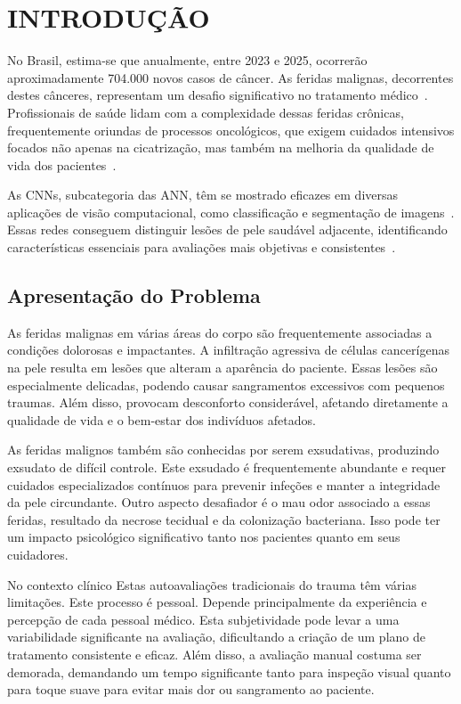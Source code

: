 \section{INTRODUÇÃO}
No Brasil, estima-se que anualmente, entre 2023 e 2025, ocorrerão aproximadamente 704.000 novos casos de câncer. As feridas malignas, decorrentes destes cânceres, representam um desafio significativo no tratamento médico~\cite{de2023estimativa}. Profissionais de saúde lidam com a complexidade dessas feridas crônicas, frequentemente oriundas de processos oncológicos, que exigem cuidados intensivos focados não apenas na cicatrização, mas também na melhoria da qualidade de vida dos pacientes~\cite{freitas2017intervenccoes, agra2017neoplastic}.

As \ac{CNNs}, subcategoria das \ac{ANN}, têm se mostrado eficazes em diversas aplicações de visão computacional, como classificação e segmentação de imagens~\cite{sun2023convolution}. Essas redes conseguem distinguir lesões de pele saudável adjacente, identificando características essenciais para avaliações mais objetivas e consistentes~\cite{litjens2017, lundervold2019, esteva2019}.

\subsection{Apresentação do Problema}

As feridas malignas em várias áreas do corpo são frequentemente associadas a condições dolorosas e impactantes. A infiltração agressiva de células cancerígenas na pele resulta em lesões que alteram a aparência do paciente. Essas lesões são especialmente delicadas, podendo causar sangramentos excessivos com pequenos traumas. Além disso, provocam desconforto considerável, afetando diretamente a qualidade de vida e o bem-estar dos indivíduos afetados.

As feridas malignos também são conhecidas por serem exsudativas, produzindo exsudato de difícil controle. Este exsudado é frequentemente abundante e requer cuidados especializados contínuos para prevenir infeções e manter a integridade da pele circundante. Outro aspecto desafiador é o mau odor associado a essas feridas, resultado da necrose tecidual e da colonização bacteriana. Isso pode ter um impacto psicológico significativo tanto nos pacientes quanto em seus cuidadores.

No contexto clínico Estas autoavaliações tradicionais do trauma têm várias limitações. Este processo é pessoal. Depende principalmente da experiência e percepção de cada pessoal médico. Esta subjetividade pode levar a uma variabilidade significante na avaliação, dificultando a criação de um plano de tratamento consistente e eficaz. Além disso, a avaliação manual costuma ser demorada, demandando um tempo significante tanto para inspeção visual quanto para toque suave para evitar mais dor ou sangramento ao paciente.

